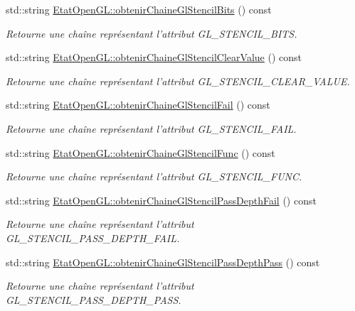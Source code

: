 \begin{DoxyCompactItemize}
std\-::string \hyperlink{group__utilitaire_ga9001f71cc6ac9cb771d5e9eeedd69c5a}{Etat\-Open\-G\-L\-::obtenir\-Chaine\-Gl\-Stencil\-Bits} () const 
\begin{DoxyCompactList}\small\item\em Retourne une chaîne représentant l'attribut G\-L\-\_\-\-S\-T\-E\-N\-C\-I\-L\-\_\-\-B\-I\-T\-S. \end{DoxyCompactList}\item 
std\-::string \hyperlink{group__utilitaire_ga0949a92c39c09a594a65cb035d992baf}{Etat\-Open\-G\-L\-::obtenir\-Chaine\-Gl\-Stencil\-Clear\-Value} () const 
\begin{DoxyCompactList}\small\item\em Retourne une chaîne représentant l'attribut G\-L\-\_\-\-S\-T\-E\-N\-C\-I\-L\-\_\-\-C\-L\-E\-A\-R\-\_\-\-V\-A\-L\-U\-E. \end{DoxyCompactList}\item 
std\-::string \hyperlink{group__utilitaire_ga3022225d3598456c739303b98e9d6ff8}{Etat\-Open\-G\-L\-::obtenir\-Chaine\-Gl\-Stencil\-Fail} () const 
\begin{DoxyCompactList}\small\item\em Retourne une chaîne représentant l'attribut G\-L\-\_\-\-S\-T\-E\-N\-C\-I\-L\-\_\-\-F\-A\-I\-L. \end{DoxyCompactList}\item 
std\-::string \hyperlink{group__utilitaire_ga1afa1d486d88c628562ec9e9ba6f6e10}{Etat\-Open\-G\-L\-::obtenir\-Chaine\-Gl\-Stencil\-Func} () const 
\begin{DoxyCompactList}\small\item\em Retourne une chaîne représentant l'attribut G\-L\-\_\-\-S\-T\-E\-N\-C\-I\-L\-\_\-\-F\-U\-N\-C. \end{DoxyCompactList}\item 
std\-::string \hyperlink{group__utilitaire_ga2e0217d78bce7c9e8aa865fa1b2d7e1f}{Etat\-Open\-G\-L\-::obtenir\-Chaine\-Gl\-Stencil\-Pass\-Depth\-Fail} () const 
\begin{DoxyCompactList}\small\item\em Retourne une chaîne représentant l'attribut G\-L\-\_\-\-S\-T\-E\-N\-C\-I\-L\-\_\-\-P\-A\-S\-S\-\_\-\-D\-E\-P\-T\-H\-\_\-\-F\-A\-I\-L. \end{DoxyCompactList}\item 
std\-::string \hyperlink{group__utilitaire_ga722cf069559981c09c4b40810b37986f}{Etat\-Open\-G\-L\-::obtenir\-Chaine\-Gl\-Stencil\-Pass\-Depth\-Pass} () const 
\begin{DoxyCompactList}\small\item\em Retourne une chaîne représentant l'attribut G\-L\-\_\-\-S\-T\-E\-N\-C\-I\-L\-\_\-\-P\-A\-S\-S\-\_\-\-D\-E\-P\-T\-H\-\_\-\-P\-A\-S\-S. \end{DoxyCompactList}\item 

\end{DoxyCompactItemize}
